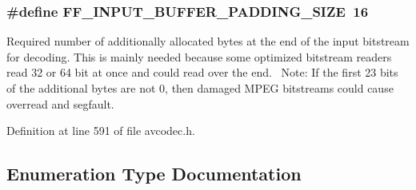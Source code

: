 \subsubsection[{\texorpdfstring{F\+F\+\_\+\+I\+N\+P\+U\+T\+\_\+\+B\+U\+F\+F\+E\+R\+\_\+\+P\+A\+D\+D\+I\+N\+G\+\_\+\+S\+I\+ZE}{FF_INPUT_BUFFER_PADDING_SIZE}}]{\setlength{\rightskip}{0pt plus 5cm}\#define F\+F\+\_\+\+I\+N\+P\+U\+T\+\_\+\+B\+U\+F\+F\+E\+R\+\_\+\+P\+A\+D\+D\+I\+N\+G\+\_\+\+S\+I\+ZE~16}\hypertarget{group__lavc__decoding_ga9207dd7cb4ee4416f8fd1f7a63af34b7}{}\label{group__lavc__decoding_ga9207dd7cb4ee4416f8fd1f7a63af34b7}
Required number of additionally allocated bytes at the end of the input bitstream for decoding. This is mainly needed because some optimized bitstream readers read 32 or 64 bit at once and could read over the end.~\newline
 Note\+: If the first 23 bits of the additional bytes are not 0, then damaged M\+P\+EG bitstreams could cause overread and segfault. 

Definition at line 591 of file avcodec.\+h.



\subsection{Enumeration Type Documentation}
